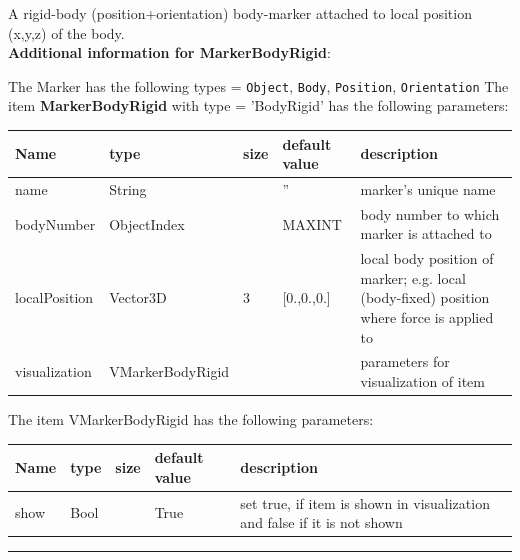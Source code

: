 \label{sec:item:MarkerBodyRigid}
A rigid-body (position+orientation) body-marker attached to local position (x,y,z) of the body.\vspace{12pt}
 \\{\bf Additional information for MarkerBodyRigid}:
\bi
  \item The Marker has the following types = \texttt{Object}, \texttt{Body}, \texttt{Position}, \texttt{Orientation}
\ei
\vspace{12pt} \noindent The item {\bf MarkerBodyRigid} with type = 'BodyRigid' has the following parameters:\vspace{-1cm}\\ 
\begin{center}
  \footnotesize
  \begin{longtable}{| p{4.5cm} | p{2.5cm} | p{0.5cm} | p{2.5cm} | p{6cm} |}
    \hline
    \bf Name & \bf type & \bf size & \bf default value & \bf description \\ \hline
    name &     String &      &     '' &     marker's unique name\\ \hline
    bodyNumber &     ObjectIndex &      &     MAXINT &     body number to which marker is attached to\\ \hline
    localPosition &     Vector3D &     3 &     [0.,0.,0.] &     local body position of marker; e.g. local (body-fixed) position where force is applied to\\ \hline
    visualization & VMarkerBodyRigid & & & parameters for visualization of item \\ \hline
	  \end{longtable}
	\end{center}
The item VMarkerBodyRigid has the following parameters:\vspace{-1cm}\\ 
\begin{center}
  \footnotesize
  \begin{longtable}{| p{4.5cm} | p{2.5cm} | p{0.5cm} | p{2.5cm} | p{6cm} |}
    \hline
    \bf Name & \bf type & \bf size & \bf default value & \bf description \\ \hline
    show &     Bool &      &     True &     set true, if item is shown in visualization and false if it is not shown\\ \hline
	  \end{longtable}
	\end{center}
\par\noindent\rule{\textwidth}{0.4pt}
